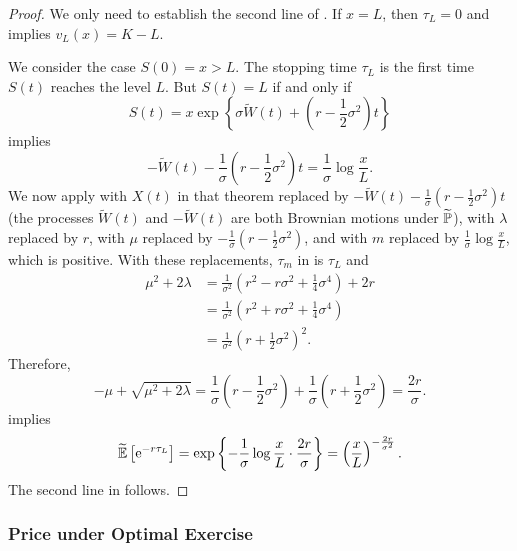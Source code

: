 \begin{proof}
	We only need to establish the second line of . If $x = L$, then $\tau_L = 0$ and  implies $v_L(x) = K - L$.

	We consider the case $S(0) = x > L$. The stopping time $\tau_L$ is the first time $S(t)$ reaches the level $L$. But $S(t) = L$ if and only if
	\[
		S(t) = x \exp \left\{ \sigma \widetilde{W}(t) + \left( r - \frac{1}{2}\sigma^2 \right) t \right\}
	\]
	implies
	\[
		-\widetilde{W}(t) - \frac{1}{\sigma}\left( r - \frac{1}{2}\sigma^2 \right) t = \frac{1}{\sigma} \log \frac{x}{L}.
	\]
	We now apply  with $X(t)$ in that theorem replaced by $-\widetilde{W}(t) - \frac{1}{\sigma}\left( r - \frac{1}{2}\sigma^2 \right) t$ (the processes $\widetilde{W}(t)$ and $-\widetilde{W}(t)$ are both Brownian motions under $\widetilde{\mathbb{P}}$), with $\lambda$ replaced by $r$, with $\mu$ replaced by $-\frac{1}{\sigma}\left( r - \frac{1}{2}\sigma^2 \right)$, and with $m$ replaced by $\frac{1}{\sigma} \log \frac{x}{L}$, which is positive. With these replacements, $\tau_m$ in  is $\tau_L$ and
	\begin{align*}
		\mu^2 + 2\lambda & = \frac{1}{\sigma^2} \left( r^2 - r\sigma^2 + \frac{1}{4}\sigma^4 \right) + 2r \\
		                 & = \frac{1}{\sigma^2} \left( r^2 + r\sigma^2 + \frac{1}{4}\sigma^4 \right)      \\
		                 & = \frac{1}{\sigma^2} \left( r + \frac{1}{2}\sigma^2 \right)^2.
	\end{align*}
	Therefore,
	\[
		-\mu + \sqrt{\mu^2 + 2\lambda} = \frac{1}{\sigma}\left( r - \frac{1}{2}\sigma^2 \right) + \frac{1}{\sigma}\left( r + \frac{1}{2}\sigma^2 \right) = \frac{2r}{\sigma}.
	\]
	 implies
	\[
		\widetilde{\mathbb{E}} \left[ \mathrm{e}^{-r\tau_L} \right] = \exp \left\{ -\frac{1}{\sigma} \log \frac{x}{L} \cdot \frac{2r}{\sigma} \right\} = \left( \frac{x}{L} \right)^{-\frac{2r}{\sigma^2}}.
	\]
	The second line in  follows.
\end{proof}

\subsubsection{Price under Optimal Exercise}


